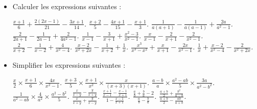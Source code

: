 \begin{itemize}
\begin{itemize}
\it $\frac{x^2+2x+1}{x^2-1}$.
\end{itemize}
\item Calculer les expressions suivantes : 
\begin{itemize}
\it $\frac{x+1}6+\frac{2(2x-1)}{21}-\frac{3x+1}{14}$.
\it $\frac{x+2}5-\frac{4x+1}{15}-\frac{x+1}3$.
\it $\frac1{a(a+1)}-\frac1{a(a-1)}+\frac{2a}{a^2-1}$.
\it $\frac{2}{2a+1}-\frac1{2a-1}+\frac2{4a^2-1}$.
\it $\frac1{x-1}-\frac3{x+1}+\frac{x^2-3}{x^2-1}$. 
\it $\frac{x}{x-1}-\frac2{x+1}-\frac2{x^2-1}$.
\it $\frac2{x+2}-\frac1{x-2}+\frac4{x^2-4}$.
\it $\frac{x-2}{x^2+2x}-\frac1{x+2}+\frac1x$.
\it $\frac{x^3}{x^3-x^2}+\frac{x}{x+1}-\frac{2x}{x^2-1}$.
\it $\frac1x+\frac{x-2}{x^2-4}-\frac2{x^2+2x}$.
\end{itemize}
\item Simplifier les expressions suivantes : 
\begin{itemize}
\it $\frac{x}2\times\frac{x+1}6\times\frac{4x}{x^2-1}$.
\it $\frac{x+3}5\times\frac{x+1}{x^2}\times\frac{x}{(x+3)(x+1)}$.
\it $\frac{a-b}a\times\frac{a^2-ab}5\times\frac{3a}{a^2-b^2}$.
\it $\frac1{a^2-ab}\times\frac4{a^2}\times\frac{a^2-b^2}5$.
\it $\frac{\frac{x}{x-y}-\frac{y}{x+y}}{\frac{x}{x+y}+\frac{y}{x-y}}$.
\it $\frac{\frac{x+1}{x-1}-\frac{x-1}{x+1}}{1-\frac{x-1}{x+1}}$.
\it $\frac{\frac{a}b+\frac{b}a-2}{\frac{a}{b}-\frac{b}{a}}$.
\it $\frac{\frac{a+b}2+\frac{b^2}{a-b}}{\frac{a+b}2-\frac{ab}{a+b}}$.

\end{itemize}
\end{itemize}